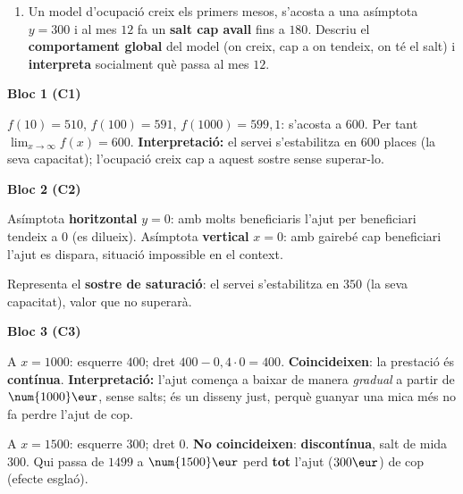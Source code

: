 \begin{enumerate}[label=\textbf{\arabic*.}, leftmargin=2em, itemsep=7pt, start=6]
  \item Un model d'ocupació creix els primers mesos, s'acosta a una asímptota $y=300$ i
        al mes $12$ fa un \textbf{salt cap avall} fins a $180$. Descriu el
        \textbf{comportament global} del model (on creix, cap a on tendeix, on té el
        salt) i \textbf{interpreta} socialment què passa al mes $12$.
\end{enumerate}

\newpage
\begin{solucions}

\noindent\textbf{Bloc 1 (C1)}
\begin{sollist}
  \item $f(10)=510$, $f(100)=591$, $f(1000)=599,1$: s'acosta a $600$. Per tant
        $\lim_{x\to\infty}f(x)=600$. \textbf{Interpretació:} el servei s'estabilitza en
        $600$ places (la seva capacitat); l'ocupació creix cap a aquest sostre sense
        superar-lo.
\end{sollist}

\noindent\textbf{Bloc 2 (C2)}
\begin{sollist}\setcounter{enumi}{1}
  \item Asímptota \textbf{horitzontal} $y=0$: amb molts beneficiaris l'ajut per
        beneficiari tendeix a $0$ (es dilueix). Asímptota \textbf{vertical} $x=0$: amb
        gairebé cap beneficiari l'ajut es dispara, situació impossible en el context.
  \item Representa el \textbf{sostre de saturació}: el servei s'estabilitza en $350$
        (la seva capacitat), valor que no superarà.
\end{sollist}

\noindent\textbf{Bloc 3 (C3)}
\begin{sollist}\setcounter{enumi}{3}
  \item A $x=\num{1000}$: esquerre $400$; dret $400-0,4\cdot 0=400$. \textbf{Coincideixen}:
        la prestació és \textbf{contínua}. \textbf{Interpretació:} l'ajut comença a
        baixar de manera \emph{gradual} a partir de $\num{1000}\eur$, sense salts; és un
        disseny just, perquè guanyar una mica més no fa perdre l'ajut de cop.
  \item A $x=\num{1500}$: esquerre $300$; dret $0$. \textbf{No coincideixen}:
        \textbf{discontínua}, salt de mida $300$. Qui passa de $\num{1499}$ a
        $\num{1500}\eur$ perd \textbf{tot} l'ajut ($300\eur$) de cop (efecte esglaó).
\end{sollist}


\end{solucions}
